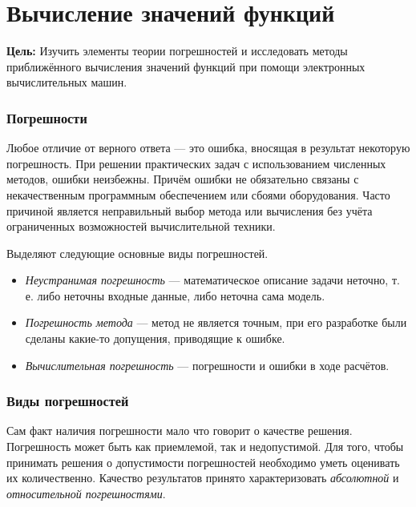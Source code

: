 \section{\noindent Вычисление значений функций}

\noindent \textbf{Цель:} Изучить элементы теории погрешностей и исследовать
методы приближённого вычисления значений функций при помощи электронных
вычислительных машин.

\medskip{}



\subsubsection{Погрешности}

Любое отличие от верного ответа — это ошибка, вносящая в результат
некоторую погрешность. При решении практических задач с использованием
численных методов, ошибки неизбежны. Причём ошибки не обязательно
связаны с некачественным программным обеспечением или сбоями оборудования.
Часто причиной является неправильный выбор метода или вычисления без
учёта ограниченных возможностей вычислительной техники.

Выделяют следующие основные виды погрешностей.
\begin{itemize}
\item \emph{Неустранимая погрешность} — математическое описание задачи неточно,
т. е. либо неточны входные данные, либо неточна сама модель.
\item \emph{Погрешность метода} — метод не является точным, при его разработке
были сделаны какие-то допущения, приводящие к ошибке.
\item \emph{Вычислительная погрешность} — погрешности и ошибки в ходе расчётов.
\end{itemize}

\subsubsection{Виды погрешностей}

Сам факт наличия погрешности мало что говорит о качестве решения.
Погрешность может быть как приемлемой, так и недопустимой. Для того,
чтобы принимать решения о допустимости погрешностей необходимо уметь
оценивать их количественно. Качество результатов принято характеризовать
\emph{абсолютной} и \emph{относительной погрешностями}.

